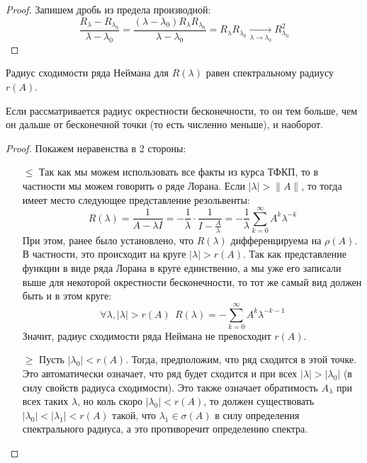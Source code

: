 \begin{proof}
	Запишем дробь из предела производной:
	\[
		\frac{R_\lambda - R_{\lambda_0}}{\lambda - \lambda_0} = \frac{(\lambda - \lambda_0)R_\lambda R_{\lambda_0}}{\lambda - \lambda_0} = R_\lambda R_{\lambda_0} \xrightarrow[\lambda \to \lambda_0]{} R_{\lambda_0}^2
	\]
\end{proof}

\begin{proposition}
	Радиус сходимости ряда Неймана для $R(\lambda)$ равен спектральному радиусу $r(A)$.
\end{proposition}

\begin{anote}
	Если рассматривается радиус окрестности бесконечности, то он тем больше, чем он дальше от бесконечной точки (то есть численно меньше), и наоборот. 
\end{anote}

\begin{proof}
	Покажем неравенства в 2 стороны:
	\begin{itemize}
		\item[$\le$] Так как мы можем использовать все факты из курса ТФКП, то в частности мы можем говорить о ряде Лорана. Если $|\lambda| > \|A\|$, то тогда имеет место следующее представление резольвенты:
		\[
			R(\lambda) = \frac{1}{A - \lambda I} = -\frac{1}{\lambda} \cdot \frac{1}{I - \frac{A}{\lambda}} = -\frac{1}{\lambda}\sum_{k = 0}^\infty A^k\lambda^{-k}
		\]
		При этом, ранее было установлено, что $R(\lambda)$ дифференцируема на $\rho(A)$. В частности, это происходит на круге $|\lambda| > r(A)$. Так как представление функции в виде ряда Лорана в круге единственно, а мы уже его записали выше для некоторой окрестности бесконечности, то тот же самый вид должен быть и в этом круге:
		\[
			\forall \lambda, |\lambda| > r(A)\ \ R(\lambda) = -\sum_{k = 0}^\infty A^k\lambda^{-k - 1}
		\]
		Значит, радиус сходимости ряда Неймана не превосходит $r(A)$.
		
		\item[$\ge$] Пусть $|\lambda_0| < r(A)$. Тогда, предположим, что ряд сходится в этой точке. Это автоматически означает, что ряд будет сходится и при всех $|\lambda| > |\lambda_0|$ (в силу свойств радиуса сходимости). Это также означает обратимость $A_\lambda$ при всех таких $\lambda$, но коль скоро $|\lambda_0| < r(A)$, то должен существовать $|\lambda_0| < |\lambda_1| < r(A)$ такой, что $\lambda_1 \in \sigma(A)$ в силу определения спектрального радиуса, а это противоречит определению спектра.
	\end{itemize}
\end{proof}

